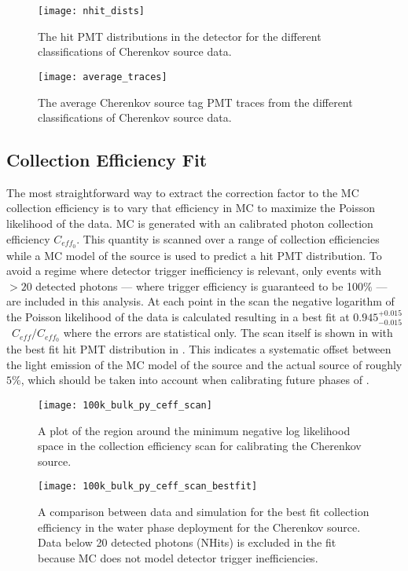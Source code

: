 \begin{figure}
\centering
\texttt{[image: nhit\_dists]}
\caption{\label{fig:chsrc_nhits} The hit PMT distributions in the {\snop} detector for the different classifications of Cherenkov source data.}
\end{figure}


\begin{figure}
\centering
\texttt{[image: average\_traces]}
\caption{\label{fig:chsrc_pmttraces} The average Cherenkov source tag PMT traces from the different classifications of Cherenkov source data.}
\end{figure}

\subsection{Collection Efficiency Fit}
\label{sec:water_fit}
The most straightforward way to extract the correction factor to the MC collection efficiency is to vary that efficiency in MC to maximize the Poisson likelihood of the data.
MC is generated with an \N calibrated photon collection efficiency $C_{eff_0}$.
This quantity is scanned over a range of collection efficiencies while a MC model of the source is used to predict a hit PMT distribution.
To avoid a regime where detector trigger inefficiency is relevant, only events with $>20$ detected photons --- where trigger efficiency is guaranteed to be 100$\%$ --- are included in this analysis.
At each point in the scan the negative logarithm of the Poisson likelihood of the data is calculated resulting in a best fit at $0.945^{+0.015}_{-0.015}$~$C_{eff}/C_{eff_0}$ where the errors are statistical only.
The scan itself is shown in  with the best fit hit PMT distribution in .
This indicates a systematic offset between the light emission of the MC model of the source and the actual source of roughly $5\%$, which should be taken into account when calibrating future phases of {\snop}.

\begin{figure}
\centering
\texttt{[image: 100k\_bulk\_py\_ceff\_scan]}
\caption{\label{fig:chsrc_scan} A plot of the region around the minimum negative log likelihood space in the collection efficiency scan for calibrating the Cherenkov source.}
\end{figure}

\begin{figure}
\centering
\texttt{[image: 100k\_bulk\_py\_ceff\_scan\_bestfit]}
\caption{\label{fig:chsrc_bestfit} A comparison between data and simulation for the best fit collection efficiency in the water phase deployment for the Cherenkov source.
Data below 20 detected photons (NHits) is excluded in the fit because MC does not model detector trigger inefficiencies.}
\end{figure}

